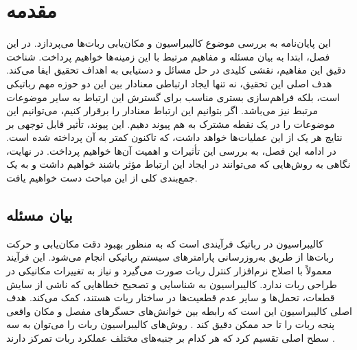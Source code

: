 
\chapter{مقدمه}

این پایان‌نامه به بررسی موضوع کالیبراسیون و مکان‌یابی ربات‌ها می‌پردازد. در این فصل، ابتدا به بیان مسئله و مفاهیم مرتبط با این زمینه‌ها خواهیم پرداخت. شناخت دقیق این مفاهیم، نقشی کلیدی در حل مسائل و دستیابی به اهداف تحقیق ایفا می‌کند. هدف اصلی این تحقیق، نه تنها ایجاد ارتباطی معنادار بین این دو حوزه مهم رباتیکی است، بلکه فراهم‌سازی بستری مناسب برای گسترش این ارتباط به سایر موضوعات مرتبط نیز می‌باشد. اگر بتوانیم این ارتباط معنادار را برقرار کنیم، می‌توانیم این موضوعات را در یک نقطه مشترک به هم پیوند دهیم. این پیوند، تأثیر قابل توجهی بر نتایج هر یک از این عملیات‌ها خواهد داشت، که تاکنون کمتر به آن پرداخته شده است. در ادامه این فصل، به بررسی این تأثیرات و اهمیت آن‌ها خواهیم پرداخت. در نهایت، نگاهی به روش‌هایی که می‌توانند در ایجاد این ارتباط مؤثر باشند خواهیم داشت و به یک جمع‌بندی کلی از این مباحث دست خواهیم یافت.


\section{بیان مسئله}
کالیبراسیون در رباتیک فرآیندی است که به منظور بهبود دقت مکان‌یابی و حرکت ربات‌ها از طریق به‌روزرسانی پارامترهای سیستم رباتیکی انجام می‌شود. این فرآیند معمولاً با اصلاح نرم‌افزار کنترل ربات صورت می‌گیرد و نیاز به تغییرات مکانیکی در طراحی ربات ندارد. کالیبراسیون به شناسایی و تصحیح خطاهایی که ناشی از سایش قطعات، تحمل‌ها و سایر عدم قطعیت‌ها در ساختار ربات هستند، کمک می‌کند. هدف اصلی کالیبراسیون این است که رابطه بین خوانش‌های حسگرهای مفصل و مکان واقعی پنجه ربات را تا حد ممکن دقیق کند 
\cite{roth1987overview}.
روش‌های کالیبراسیون ربات را می‌توان به سه سطح اصلی تقسیم کرد که هر کدام بر جنبه‌های مختلف عملکرد ربات تمرکز دارند
\cite{elatta2004overview, roth1987overview}.

